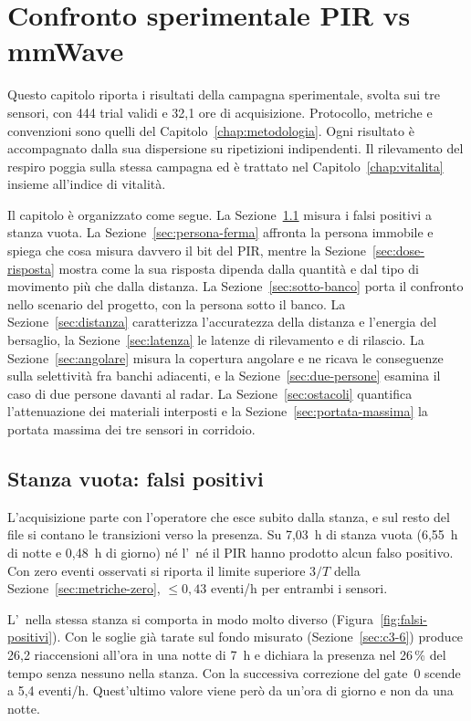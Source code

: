 \chapter{Confronto sperimentale PIR vs mmWave}
\label{chap:confronto}

Questo capitolo riporta i risultati della campagna sperimentale, svolta sui tre sensori, con 444 trial validi e 32,1 ore di acquisizione. Protocollo, metriche e convenzioni sono quelli del Capitolo~\ref{chap:metodologia}. Ogni risultato è accompagnato dalla sua dispersione su ripetizioni indipendenti. Il rilevamento del respiro poggia sulla stessa campagna ed è trattato nel Capitolo~\ref{chap:vitalita} insieme all'indice di vitalità.

Il capitolo è organizzato come segue. La Sezione~\ref{sec:falsi-positivi} misura i falsi positivi a stanza vuota. La Sezione~\ref{sec:persona-ferma} affronta la persona immobile e spiega che cosa misura davvero il bit del PIR, mentre la Sezione~\ref{sec:dose-risposta} mostra come la sua risposta dipenda dalla quantità e dal tipo di movimento più che dalla distanza. La Sezione~\ref{sec:sotto-banco} porta il confronto nello scenario del progetto, con la persona sotto il banco. La Sezione~\ref{sec:distanza} caratterizza l'accuratezza della distanza e l'energia del bersaglio, la Sezione~\ref{sec:latenza} le latenze di rilevamento e di rilascio. La Sezione~\ref{sec:angolare} misura la copertura angolare e ne ricava le conseguenze sulla selettività fra banchi adiacenti, e la Sezione~\ref{sec:due-persone} esamina il caso di due persone davanti al radar. La Sezione~\ref{sec:ostacoli} quantifica l'attenuazione dei materiali interposti e la Sezione~\ref{sec:portata-massima} la portata massima dei tre sensori in corridoio.

\section{Stanza vuota: falsi positivi}
\label{sec:falsi-positivi}

L'acquisizione parte con l'operatore che esce subito dalla stanza, e sul resto del
file si contano le transizioni verso la presenza. Su 7,03~h di stanza vuota (6,55~h di notte e 0,48~h di giorno) né l'\ldb\ né il PIR hanno prodotto alcun
falso positivo. Con zero eventi osservati si riporta il limite superiore $3/T$ della
Sezione~\ref{sec:metriche-zero}, $\leq 0{,}43$ eventi/h per entrambi i sensori.

L'\ldc\ nella stessa stanza si comporta in modo molto diverso
(Figura~\ref{fig:falsi-positivi}). Con le soglie già tarate sul fondo misurato (Sezione~\ref{sec:c3-6}) produce 26,2 riaccensioni all'ora in una notte di 7~h
e dichiara la presenza nel 26\,\% del tempo senza nessuno nella stanza. Con la
successiva correzione del gate~0 scende a 5,4 eventi/h. Quest'ultimo valore viene però da un'ora di giorno e non da una notte.

